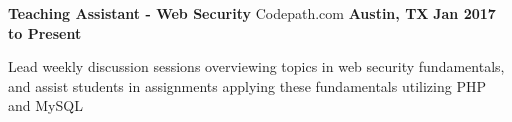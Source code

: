 \begin{cventries}
	\cventry
		{\normalsize \textbf{Teaching Assistant - Web Security}}
		{\large Codepath.com}
		{\normalsize \textbf{Austin, TX}}
		{\normalsize \textbf{Jan 2017 to Present}}
		{
			\begin{cvitems}
				\item {\normalsize Lead weekly discussion sessions overviewing topics in web security fundamentals, and assist students in assignments applying these fundamentals utilizing PHP and MySQL}
			\end{cvitems}
		}
\end{cventries}